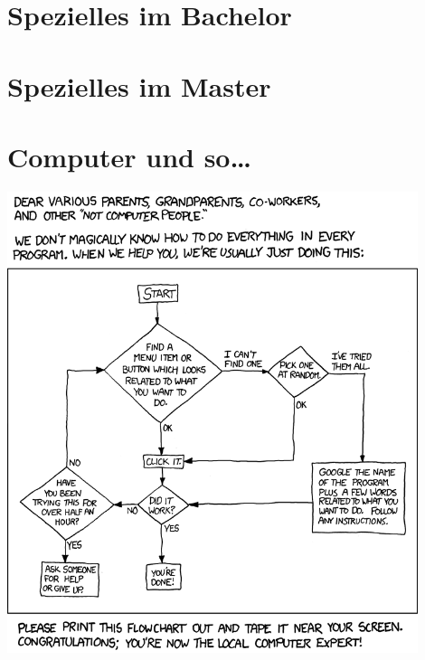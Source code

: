 \documentclass[
  final,
  a4paper,              %
  style=screen,
  twoside,
  nexus,                %
  lnum,                 %
]{tubsartcl}
\begin{document}
	\section{Spezielles im Bachelor}
		\label{bachelor}
		\begin{multicols}{2}
		
		
		
		\end{multicols}
		

	\section{Spezielles im Master}
		\label{master}
		
	\newpage

	\section{Computer und so\ldots}
		\label{computer}
		
		\vfill
		\begin{center}
				\includegraphics[width=0.9\textwidth]{bilder/XKCD/tech_support_cheat_sheet}
		\end{center}
		\vfill
	\newpage
\end{document}
